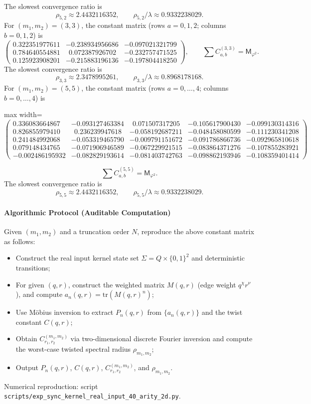 The slowest convergence ratio is
\[
\rho_{5,2}\approx 2.4432116352,\qquad \rho_{5,2}/\lambda\approx 0.9332238029.
\]
For $(m_1,m_2)=(3,3)$, the constant matrix (rows $a=0,1,2$; columns $b=0,1,2$) is
\[
\begin{pmatrix}
0.322351977611 & -0.238934956686 & -0.097021321799\\
0.784640554881 & \ \ 0.072387926702 & -0.232757471525\\
0.125923908201 & -0.215883196136 & -0.197804418250
\end{pmatrix},
\qquad
\sum C_{a,b}^{(3,3)}=\mathsf{M}_{\varphi^2}.
\]
The slowest convergence ratio is
\[
\rho_{3,3}\approx 2.3478995261,\qquad \rho_{3,3}/\lambda\approx 0.8968178168.
\]
For $(m_1,m_2)=(5,5)$, the constant matrix (rows $a=0,\dots,4$; columns $b=0,\dots,4$) is
\begin{center}
\begin{adjustbox}{max width=\linewidth}
\(\begin{pmatrix}
0.336083664867 & -0.093127463384 & \ \ 0.071507317205 & -0.105617900430 & -0.099130314316\\
0.826855979410 & \ \ 0.236239947618 & -0.058192687211 & -0.048458080599 & -0.111230341208\\
0.241484992068 & -0.053319465790 & -0.009791151672 & -0.091786866736 & -0.092965810618\\
0.079148434765 & -0.071906946589 & -0.067229921515 & -0.083864371276 & -0.107855283921\\
-0.002486195932 & -0.082829193614 & -0.081403742763 & -0.098862193946 & -0.108359401414
\end{pmatrix}\)
\end{adjustbox}
\end{center}
\[
\sum C_{a,b}^{(5,5)}=\mathsf{M}_{\varphi^2}.
\]
The slowest convergence ratio is
\[
\rho_{5,5}\approx 2.4432116352,\qquad \rho_{5,5}/\lambda\approx 0.9332238029.
\]
\paragraph{Algorithmic Protocol (Auditable Computation)}
Given $(m_1,m_2)$ and a truncation order $N$, reproduce the above constant matrix as follows:
\begin{itemize}
  \item Construct the real input kernel state set $\Sigma=Q\times\{0,1\}^2$ and deterministic transitions;
  \item For given $(q,r)$, construct the weighted matrix $M(q,r)$ (edge weight $q^\chi r^\nu$), and compute $a_n(q,r)=\mathrm{tr}(M(q,r)^n)$;
  \item Use M\"obius inversion to extract $P_n(q,r)$ from $\{a_n(q,r)\}$ and the twist constant $C(q,r)$;
  \item Obtain $C_{r_1,r_2}^{(m_1,m_2)}$ via two-dimensional discrete Fourier inversion and compute the worst-case twisted spectral radius $\rho_{m_1,m_2}$;
  \item Output $P_n(q,r)$, $C(q,r)$, $C_{r_1,r_2}^{(m_1,m_2)}$, and $\rho_{m_1,m_2}$.
\end{itemize}
Numerical reproduction: script \texttt{scripts/exp\_sync\_kernel\_real\_input\_40\_arity\_2d.py}.
